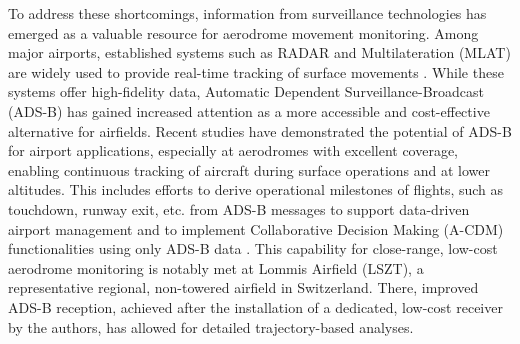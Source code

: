 \documentclass[
  manuscript=proceedings,  %
  layout=preprint,         %
  year=2025,
  volume=x,
]{extra/joas}
\begin{document}
To address these shortcomings, information from surveillance technologies has emerged as a valuable resource for aerodrome movement monitoring. Among major airports, established systems such as RADAR and Multilateration (MLAT) are widely used to provide real-time tracking of surface movements \cite{chen_2022}. While these systems offer high-fidelity data, Automatic Dependent Surveillance-Broadcast (ADS-B) has gained increased attention as a more accessible and cost-effective alternative for airfields. Recent studies have demonstrated the potential of ADS-B for airport applications, especially at aerodromes with excellent coverage, enabling continuous tracking of aircraft during surface operations and at lower altitudes. This includes efforts to derive operational milestones of flights, such as touchdown, runway exit, etc. from ADS-B messages to support data-driven airport management \cite{SCHULTZ2022} and to implement Collaborative Decision Making (A-CDM) functionalities using only ADS-B data \cite{a_cdm_lite}. This capability for close-range, low-cost aerodrome monitoring is notably met at Lommis Airfield (LSZT), a representative regional, non-towered airfield in Switzerland. There, improved ADS-B reception, achieved after the installation of a dedicated, low-cost receiver by the authors, has allowed for detailed trajectory-based analyses.
\end{document}
